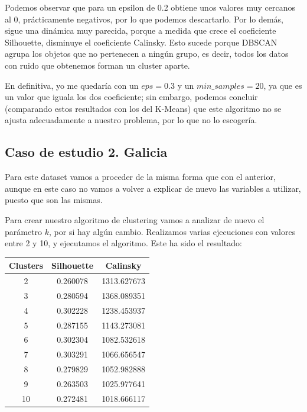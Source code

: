 \documentclass[11pt,a4paper]{article}
\begin{document}
Podemos observar que para un epsilon de 0.2 obtiene unos valores muy cercanos al 0, prácticamente negativos, por lo que podemos
descartarlo. Por lo demás, sigue una dinámica muy parecida, porque a medida que crece el coeficiente Silhouette, disminuye el
coeficiente Calinsky. Esto sucede porque DBSCAN agrupa los objetos que no pertenecen a ningún grupo, es decir, todos los datos
con ruido que obtenemos forman un cluster aparte.

En definitiva, yo me quedaría con un $eps=0.3$ y un $min\_samples=20$, ya que es un valor que iguala los dos coeficiente; sin
embargo, podemos concluir (comparando estos resultados con los del K-Means) que este algoritmo no se ajusta adecuadamente a nuestro
problema, por lo que no lo escogería.



\subsection{Caso de estudio 2. Galicia}

Para este dataset vamos a proceder de la misma forma que con el anterior, aunque en este caso no vamos a volver a explicar de nuevo
las variables a utilizar, puesto que son las mismas.

Para crear nuestro algoritmo de clustering vamos a analizar de nuevo el parámetro $k$, por si hay algún cambio. Realizamos varias
ejecuciones con valores entre 2 y 10, y ejecutamos el algoritmo. Este ha sido el resultado:

\begin{table}[H]
    \centering
    \begin{tabular}{|c|c|c|}
    \hline
    \textbf{Clusters} & \textbf{Silhouette} & \textbf{Calinsky} \\ \hline
    2 & 0.260078 & 1313.627673 \\ \hline
    3 & 0.280594 & 1368.089351 \\ \hline
    4 & 0.302228 & 1238.453937 \\ \hline
    5 & 0.287155 & 1143.273081 \\ \hline
    6 & 0.302304 & 1082.532618 \\ \hline
    7 & 0.303291 & 1066.656547 \\ \hline
    8 & 0.279829 & 1052.982888 \\ \hline
    9 & 0.263503 & 1025.977641 \\ \hline
    10 & 0.272481 & 1018.666117 \\ \hline
    \end{tabular}
\end{table}
\end{document}
